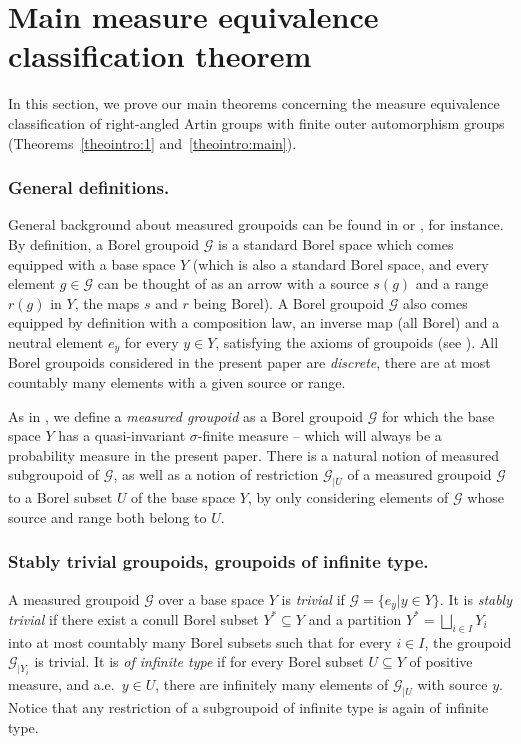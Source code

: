 \documentclass[JEP,XML,SOM,Unicode,NoFloatCountersInSection,published]{cedram}
\let\mathcal\mathscr
\theoremstyle{plain}
\theoremstyle{definition}
\let\Dunion\bigsqcup
\newcommand{\calg}{\mathcal{G}}
\begin{document}
\section{Main measure equivalence classification theorem}\label{sec:me}

In this section, we prove our main theorems concerning the measure equivalence classification of right-angled Artin groups with finite outer automorphism groups (Theorems~\ref{theointro:1} and~\ref{theointro:main}).


\subsubsection*{General definitions.} General background about measured groupoids can be found in \cite[\S 2.1]{AD} or \cite{Kid-survey}, for instance. By definition, a Borel groupoid $\mathcal{G}$ is a standard Borel space which comes equipped with a base space $Y$ (which is also a standard Borel space, and every element $g\in\calg$ can be thought of as an arrow with a source $s(g)$ and a range $r(g)$ in $Y$, the maps $s$ and $r$ being Borel). A Borel groupoid $\mathcal{G}$ also comes equipped by definition with a composition law, an inverse map (all Borel) and a neutral element $e_y$ for every $y\in Y$, satisfying the axioms of groupoids (see \eg \cite[Def.\,2.10]{Kid-survey}). All Borel groupoids considered in the present paper are \emph{discrete}, \ie there are at most countably many elements with a given source or range.

As in \cite[Def.\,2.13]{Kid-survey}, we define a \emph{measured groupoid} as a Borel groupoid $\mathcal{G}$ for which the base space $Y$ has a quasi-invariant $\sigma$-finite measure -- which will always be a probability measure in the present paper. There is a natural notion of measured subgroupoid of $\mathcal{G}$, as well as a notion of restriction $\mathcal{G}_{|U}$ of a measured groupoid $\mathcal{G}$ to a Borel subset $U$ of the base space $Y$, by only considering elements of $\calg$ whose source and range both belong to $U$.

\subsubsection*{Stably trivial groupoids, groupoids of infinite type.} A measured groupoid $\calg$ over a base space $Y$ is \emph{trivial} if $\calg=\{e_y|y\in Y\}$. It is \emph{stably trivial} if there exist a conull Borel subset $Y^*\subseteq Y$ and a partition $Y^*=\Dunion_{i\in I} Y_i$ into at most countably many Borel subsets such that for every $i\in I$, the groupoid $\calg_{|Y_i}$ is trivial. It is \emph{of infinite type} if for every Borel subset $U\subseteq Y$ of positive measure, and a.e.\ $y\in U$, there are infinitely many elements of $\calg_{|U}$ with source $y$. Notice that any restriction of a subgroupoid of infinite type is again of infinite type.
\end{document}
